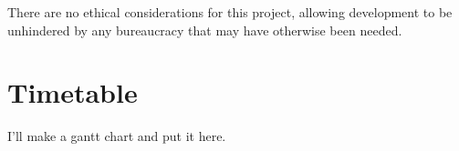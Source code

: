 \documentclass[a4paper,fleqn,11pt]{article}
\begin{document}
There are no ethical considerations for this project, allowing development to be unhindered by any bureaucracy that may have otherwise been needed.

\section{Timetable}
I'll make a gantt chart and put it here.

% 
% 
% 
% 



\end{document}
